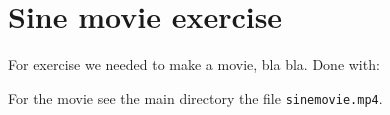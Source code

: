 \section{Sine movie exercise}

For exercise we needed to make a movie, bla bla. Done with:



For the movie see the main directory the file \texttt{sinemovie.mp4}.
